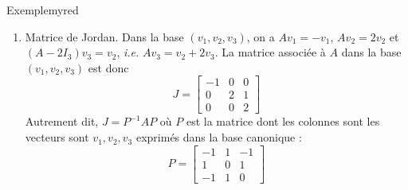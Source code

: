 \begin{omed}{Exemple}{myred}
\begin{enumerate}
\begin{align*}
\begin{bmatrix}
                    2 & 3 & -2
                \end{bmatrix} \begin{bmatrix}
                    x \\
                    y \\
                    z
                \end{bmatrix} = \begin{bmatrix}
                    1 \\
                    0 \\
                    1
                \end{bmatrix} \\
                &\iff \et{2x + 3y - 2z = 1}{x + y - z = 0} \\
                &\iff \et{x = -1 + z}{y = 1}
            \end{align*}
            En prenant par exemple $z = 0$, on choisit $v_3 = (-1,1,0)$.
            \item Matrice de Jordan. \quad Dans la base $(v_1,v_2,v_3)$, on a $A v_1 = - v_1$, $A v_2 = 2 v_2$ et $(A - 2 I_3) v_3 = v_2$, \textit{i.e.} $A v_3 = v_2 + 2v_3$. La matrice associée à $A$ dans la base $(v_1, v_2,v_3)$ est donc 
            \[ J= \begin{bmatrix}
                -1 & 0 & 0 \\
                0 & 2 & 1 \\
                0 & 0 & 2
            \end{bmatrix}
            \]  
            Autrement dit, $J = P^{-1} A P$ où $P$ est la matrice dont les colonnes sont les vecteurs sont $v_1, v_2,v_3$ exprimés dans la base canonique : 
            \[ P = \begin{bmatrix}
                -1 & 1 & -1 \\
                1 & 0 & 1 \\
                -1 & 1 & 0
            \end{bmatrix} \]   
        \end{enumerate}
    \end{omed}

